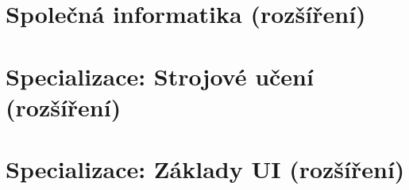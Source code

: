 \documentclass[11pt]{article}
\begin{document}
\section{Společná informatika \textnormal{\normalsize(rozšíření)}}








\section{Specializace: Strojové učení \textnormal{\normalsize(rozšíření)}}









\section{Specializace: Základy UI \textnormal{\normalsize(rozšíření)}}







\end{document}
